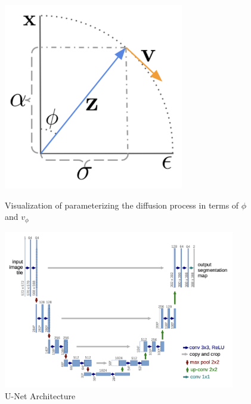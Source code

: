 \documentclass[conference]{IEEEtran}
\begin{document}
\begin{figure}[H]
   \begin{minipage}{0.50\textwidth}
        \centering
        \includegraphics[width=0.7\textwidth]{figures/figure2.png}
        \caption{Visualization of parameterizing the diffusion process in terms of $\phi $ and $v_\phi$}
        \label{fig:fig2}
    \end{minipage}
    \begin{minipage}{0.50\textwidth}
        \centering
        \includegraphics[width=0.9\textwidth]{figures/figure3.png}
        \caption{U-Net Architecture} \label{fig:fig3}
    \end{minipage}
\end{figure} \FloatBarrier
\end{document}
